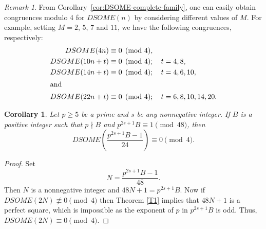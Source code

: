 \documentclass[12pt]{article}
\numberwithin{equation}{section}
\newtheorem{corollary}[theorem]{Corollary}
\theoremstyle{definition}
\theoremstyle{remark}
\newtheorem{remark}[theorem]{Remark}
\numberwithin{equation}{section}
\begin{document}
\begin{remark}\label{rem:DSOME-examples}
From Corollary~\ref{cor:DSOME-complete-family}, one can easily obtain  congruences  modulo 4 for
$DSOME(n)$ by considering different values of $M$. For example, setting $M=2$, $5$, $7$ and $11$, we have the following congruences, respectively:
\begin{align*}
DSOME(4n)
&\equiv0\pmod{4},\\
DSOME(10n+t)
&\equiv0\pmod{4}; \quad t=4, 8,\\
DSOME(14n+t)
&\equiv0\pmod{4}; \quad t=4,6, 10,\\\intertext{and}
DSOME(22n+t)&\equiv0\pmod{4};\quad t=6, 8, 10, 14, 20.
\end{align*}
\end{remark}

\begin{corollary}\label{cor:DSOME-odd-valuation}
Let $p\geq5$ be a prime and  $s$ be any nonnegative integer. If $B$ is a positive integer such that $p\nmid B$ and $p^{2s+1}B\equiv1\pmod{48}$, then
\begin{equation*}
DSOME
\left(
\frac{p^{2s+1}B-1}{24}
\right)
\equiv0\pmod{4}.
\end{equation*}
\end{corollary}

\begin{proof}
Set
\begin{equation*}
N=\frac{p^{2s+1}B-1}{48}.
\end{equation*}
Then $N$ is a nonnegative integer and
$
48N+1=p^{2s+1}B.
$
Now if  $DSOME(2N)\not\equiv0\pmod{4}$ then 
Theorem  \ref{T1} implies that $48N+1$ is a perfect square, 
which is impossible as the exponent of $p$ in
$p^{2s+1}B$ is odd. Thus,
$DSOME(2N)\equiv0\pmod{4}$. 
\end{proof}
\end{document}

